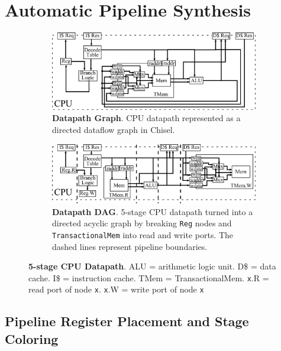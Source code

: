 \section{Automatic Pipeline Synthesis}
\begin{figure}[htb]
\centering
  \begin{subfigure}[t]{0.8\textwidth}
  \centering
  \includegraphics[width=\textwidth]{figures/pipeline.pdf}
  \caption{{\bf Datapath Graph}. CPU datapath represented as a
    directed dataflow graph in Chisel.}
  \label{fig:datapathgrah}
  \end{subfigure}
  \begin{subfigure}[t]{0.8\textwidth}
  \vspace{20pt}
  \centering
  \includegraphics[width=\textwidth]{figures/pipelinedag.pdf}
  \caption{{\bf Datapath DAG}. 5-stage CPU datapath turned into a
    directed acyclic graph by breaking {\tt Reg} nodes and {\tt
      TransactionalMem} into read and write ports. The dashed lines
    represent pipeline boundaries.}
  \label{fig:datapathdag}
  \end{subfigure}
\caption{{\bf 5-stage CPU Datapath}. ALU = arithmetic logic unit. D\$
  = data cache. I\$ =  instruction cache. TMem =
  TransactionalMem. {\tt x}.R = read port of node {\tt x}. {\tt x}.W =
  write port of node {\tt x}}
\label{fig:datapath}
\end{figure}


\subsection{Pipeline Register Placement and Stage Coloring}



